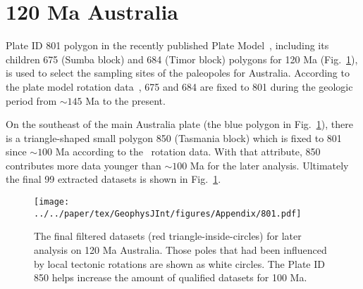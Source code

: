 \section{120 Ma Australia}

Plate ID 801 polygon in the recently published Plate Model~\citep{Y18}, including
its children 675 (Sumba block) and 684 (Timor block) polygons for
120 Ma (Fig.~\ref{fig_AUfinal}), is used to select the sampling
sites of the paleopoles for Australia. According to the plate model rotation
data~\citep{Y18}, 675 and 684 are fixed to 801 during the geologic period from
${\sim}145$ Ma to the present.

On the southeast of the main Australia plate (the blue polygon in
Fig.~\ref{fig_AUfinal}), there is a triangle-shaped small polygon 850
(Tasmania block) which is fixed to 801 since ${\sim}100$ Ma according to
the~\citet{Y18} rotation data. With that attribute, 850 contributes more data
younger than ${\sim}100$ Ma for the later analysis. Ultimately the final 99 extracted
datasets is shown in Fig.~\ref{fig_AUfinal}.

\begin{figure}
\texttt{[image: ../../paper/tex/GeophysJInt/figures/Appendix/801.pdf]}
\caption[Final filtered datasets for analysis on 120 Ma
Australia]{The final filtered datasets (red triangle-inside-circles) for later
analysis on 120 Ma Australia. Those poles that had been influenced
by local tectonic rotations are shown as white circles. The Plate ID 850 helps
increase the amount of qualified datasets for 100
Ma.}\label{fig_AUfinal}
\end{figure}


